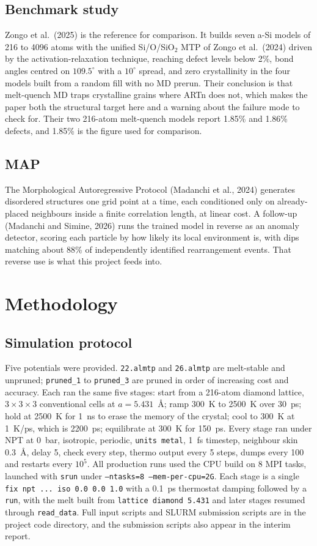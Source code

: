 \documentclass[11pt]{article}
\begin{document}
\subsection{Benchmark study}
Zongo et al.\ (2025) is the reference for comparison. It builds seven a-Si models of 216 to 4096 atoms with the unified Si/O/SiO$_2$ MTP of Zongo et al.\ (2024) driven by the activation-relaxation technique, reaching defect levels below 2\%, bond angles centred on $109.5^\circ$ with a $10^\circ$ spread, and zero crystallinity in the four models built from a random fill with no MD prerun. Their conclusion is that melt-quench MD traps crystalline grains where ARTn does not, which makes the paper both the structural target here and a warning about the failure mode to check for. Their two 216-atom melt-quench models report 1.85\% and 1.86\% defects, and 1.85\% is the figure used for comparison.

\subsection{MAP}
The Morphological Autoregressive Protocol (Madanchi et al., 2024) generates disordered structures one grid point at a time, each conditioned only on already-placed neighbours inside a finite correlation length, at linear cost. A follow-up (Madanchi and Simine, 2026) runs the trained model in reverse as an anomaly detector, scoring each particle by how likely its local environment is, with dips matching about 88\% of independently identified rearrangement events. That reverse use is what this project feeds into.

\section{Methodology}

\subsection{Simulation protocol}
Five potentials were provided. \texttt{22.almtp} and \texttt{26.almtp} are melt-stable and unpruned; \texttt{pruned\_1} to \texttt{pruned\_3} are pruned in order of increasing cost and accuracy. Each ran the same five stages: start from a 216-atom diamond lattice, $3\times3\times3$ conventional cells at $a = 5.431$~\AA; ramp 300~K to 2500~K over 30~ps; hold at 2500~K for 1~ns to erase the memory of the crystal; cool to 300~K at 1~K/ps, which is 2200~ps; equilibrate at 300~K for 150~ps. Every stage ran under NPT at 0~bar, isotropic, periodic, \texttt{units metal}, 1~fs timestep, neighbour skin 0.3~\AA, delay 5, check every step, thermo output every 5 steps, dumps every 100 and restarts every $10^5$. All production runs used the CPU build on 8 MPI tasks, launched with \texttt{srun} under \texttt{--ntasks=8 --mem-per-cpu=2G}. Each stage is a single \texttt{fix npt ... iso 0.0 0.0 1.0} with a 0.1~ps thermostat damping followed by a \texttt{run}, with the melt built from \texttt{lattice diamond 5.431} and later stages resumed through \texttt{read\_data}. Full input scripts and SLURM submission scripts are in the project code directory, and the submission scripts also appear in the interim report.
\end{document}
